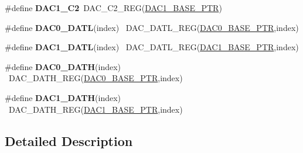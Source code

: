 \begin{DoxyCompactItemize}
\item 
\hypertarget{group___d_a_c___register___accessor___macros_ga6d25060cd417d1308e26e29540996d64}{}\#define {\bfseries D\+A\+C1\+\_\+\+C2}~D\+A\+C\+\_\+\+C2\+\_\+\+R\+E\+G(\hyperlink{group___d_a_c___peripheral_gab3af24d21edf756c3f794c52b5789847}{D\+A\+C1\+\_\+\+B\+A\+S\+E\+\_\+\+P\+T\+R})\label{group___d_a_c___register___accessor___macros_ga6d25060cd417d1308e26e29540996d64}

\item 
\hypertarget{group___d_a_c___register___accessor___macros_gad1e226ca5378cccb3032a3e65ee3aabd}{}\#define {\bfseries D\+A\+C0\+\_\+\+D\+A\+T\+L}(index)                                              ~D\+A\+C\+\_\+\+D\+A\+T\+L\+\_\+\+R\+E\+G(\hyperlink{group___d_a_c___peripheral_gabe3b30df06ec04e5c899efd6e49f1800}{D\+A\+C0\+\_\+\+B\+A\+S\+E\+\_\+\+P\+T\+R},index)\label{group___d_a_c___register___accessor___macros_gad1e226ca5378cccb3032a3e65ee3aabd}

\item 
\hypertarget{group___d_a_c___register___accessor___macros_ga1f9628b3cb6c5c9111065c256a88f8d5}{}\#define {\bfseries D\+A\+C1\+\_\+\+D\+A\+T\+L}(index)                                              ~D\+A\+C\+\_\+\+D\+A\+T\+L\+\_\+\+R\+E\+G(\hyperlink{group___d_a_c___peripheral_gab3af24d21edf756c3f794c52b5789847}{D\+A\+C1\+\_\+\+B\+A\+S\+E\+\_\+\+P\+T\+R},index)\label{group___d_a_c___register___accessor___macros_ga1f9628b3cb6c5c9111065c256a88f8d5}

\item 
\hypertarget{group___d_a_c___register___accessor___macros_gab4d4a155e15a18015eddcab55644a588}{}\#define {\bfseries D\+A\+C0\+\_\+\+D\+A\+T\+H}(index)                                              ~D\+A\+C\+\_\+\+D\+A\+T\+H\+\_\+\+R\+E\+G(\hyperlink{group___d_a_c___peripheral_gabe3b30df06ec04e5c899efd6e49f1800}{D\+A\+C0\+\_\+\+B\+A\+S\+E\+\_\+\+P\+T\+R},index)\label{group___d_a_c___register___accessor___macros_gab4d4a155e15a18015eddcab55644a588}

\item 
\hypertarget{group___d_a_c___register___accessor___macros_ga053b7c88283d47e7ce95a9f04b4affe3}{}\#define {\bfseries D\+A\+C1\+\_\+\+D\+A\+T\+H}(index)                                              ~D\+A\+C\+\_\+\+D\+A\+T\+H\+\_\+\+R\+E\+G(\hyperlink{group___d_a_c___peripheral_gab3af24d21edf756c3f794c52b5789847}{D\+A\+C1\+\_\+\+B\+A\+S\+E\+\_\+\+P\+T\+R},index)\label{group___d_a_c___register___accessor___macros_ga053b7c88283d47e7ce95a9f04b4affe3}

\end{DoxyCompactItemize}


\subsection{Detailed Description}
